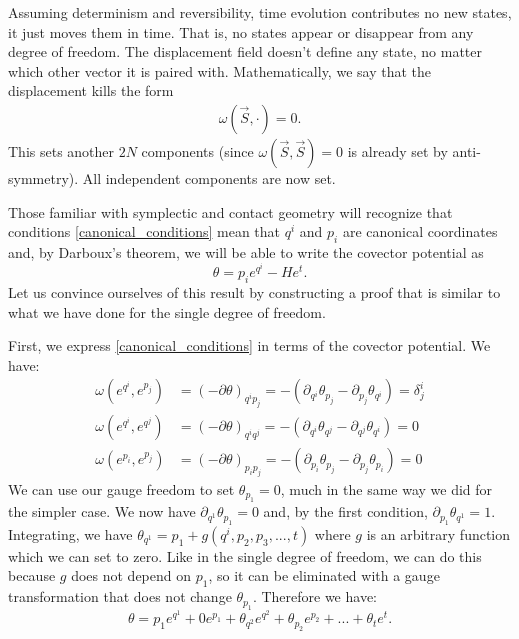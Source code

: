 \documentclass[10pt,twocolumn, nofootinbib]{revtex4-2}
\begin{document}
Assuming determinism and reversibility, time evolution contributes no new states, it just moves them in time. That is, no states appear or disappear from any degree of freedom. The displacement field doesn't define any state, no matter which other vector it is paired with. Mathematically, we say that the displacement kills the form
\begin{align}\label{mdof_displacement_kills}
	\omega(\vec{S}, \cdot) = 0.
\end{align}
This sets another $2N$ components (since $\omega(\vec{S}, \vec{S}) = 0$ is already set by anti-symmetry). All independent components are now set.

Those familiar with symplectic and contact geometry will recognize that conditions \ref{canonical_conditions} mean that $q^i$ and $p_i$ are canonical coordinates and, by Darboux's theorem, we will be able to write the covector potential as
\begin{equation}\label{mdof_potential_expression}
	\theta = p_i e^{q^i} - H e^t.
\end{equation}
Let us convince ourselves of this result by constructing a proof that is similar to what we have done for the single degree of freedom.

First, we express \ref{canonical_conditions} in terms of the covector potential. We have:
\begin{equation}\label{canonical_potential_conditions}
\begin{aligned}
	\omega(e^{q^i}, e^{p_j}) &= (-\partial\theta)_{q^i p_j} = -(\partial_{q^i}\theta_{p_j} - \partial_{p_j}\theta_{q^i}) = \delta^i_j \\
	\omega(e^{q^i}, e^{q^j}) &= (-\partial\theta)_{q^i q^j} = -(\partial_{q^i}\theta_{q^j} - \partial_{q^j}\theta_{q^i}) = 0 \\
	\omega(e^{p_i}, e^{p_j}) &= (-\partial\theta)_{p_i p_j} = -(\partial_{p_i}\theta_{p_j} - \partial_{p_j}\theta_{p_i}) = 0
\end{aligned}
\end{equation}
We can use our gauge freedom to set $\theta_{p_1} = 0$, much in the same way we did for the simpler case. We now have $\partial_{q^1} \theta_{p_1} = 0$ and, by the first condition, $\partial_{p_1} \theta_{q^1} = 1$. Integrating, we have $\theta_{q^1} = p_1 + g(q^i, p_2, p_3, ..., t)$ where $g$ is an arbitrary function which we can set to zero. Like in the single degree of freedom, we can do this because $g$ does not depend on $p_1$, so it can be eliminated with a gauge transformation that does not change $\theta_{p_1}$. Therefore we have:
\begin{equation}
	\theta = p_1 e^{q^1} + 0 e^{p_1} + \theta_{q^2} e^{q^2} + \theta_{p_2} e^{p_2} + ... + \theta_{t} e^{t}.
\end{equation}
\end{document}
